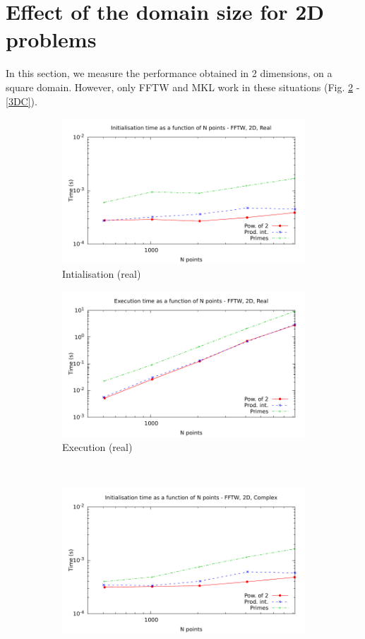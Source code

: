 \documentclass[12pt, a4paper]{article}
\begin{document}
\section{Effect of the domain size for 2D problems}\label{PERFORMANCE2D}
In this section, we measure the performance obtained in 2 dimensions, on a square domain. However, only FFTW and MKL work in these situations (Fig. \ref{2DFFTWR} - \ref{3DC}).\\
\begin{figure}[H]
\captionsetup{width=0.8\linewidth}
\centering
\begin{subfigure}{.5\textwidth}
\centering
\includegraphics[width=.9\linewidth]{graphs/2d-fftw-init-r.pdf}
\caption{Intialisation (real)}
\label{2DFFTWRI}
\end{subfigure}%
\begin{subfigure}{.5\textwidth}
\centering
\includegraphics[width=.9\linewidth]{graphs/2d-fftw-exec-r.pdf}
\caption{Execution (real)}
\label{2DFFTWR}
\end{subfigure}\\
\begin{subfigure}{.5\textwidth}
\centering
\includegraphics[width=.9\linewidth]{graphs/2d-fftw-init-c.pdf}

\end{subfigure}
\end{figure}
\end{document}
